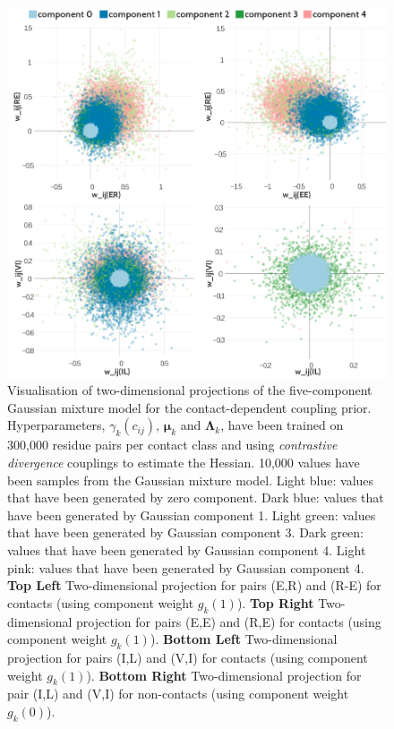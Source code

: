 \documentclass[11pt,a4paper,twoside]{book}
\newcommand{\Lk}{\mathbf{\Lambda}_k}
\newcommand{\muk}{\mathbf{\mu}_k}
\newcommand{\cij}{c_{ij}}
\theoremstyle{definition}
\theoremstyle{definition}
\theoremstyle{remark}
\begin{document}
\begin{figure}
\includegraphics[width=1\linewidth]{img/bayesian_model/cd/5/2dvis_combined_300k} \caption{Visualisation of two-dimensional
projections of the five-component Gaussian mixture model for the
contact-dependent coupling prior. Hyperparameters, \(\gamma_k(\cij)\),
\(\muk\) and \(\Lk\), have been trained on 300,000 residue pairs per
contact class and using \emph{contrastive divergence} couplings to
estimate the Hessian. 10,000 values have been samples from the Gaussian
mixture model. Light blue: values that have been generated by zero
component. Dark blue: values that have been generated by Gaussian
component 1. Light green: values that have been generated by Gaussian
component 3. Dark green: values that have been generated by Gaussian
component 4. Light pink: values that have been generated by Gaussian
component 4. \textbf{Top Left} Two-dimensional projection for pairs
(E,R) and (R-E) for contacts (using component weight \(g_k(1)\)).
\textbf{Top Right} Two- dimensional projection for pairs (E,E) and (R,E)
for contacts (using component weight \(g_k(1)\)). \textbf{Bottom Left}
Two-dimensional projection for pairs (I,L) and (V,I) for contacts (using
component weight \(g_k(1)\)). \textbf{Bottom Right} Two-dimensional
projection for pair (I,L) and (V,I) for non-contacts (using component
weight \(g_k(0)\)).}\label{fig:vis2d-cd-5comp-300k}
\end{figure}
\end{document}
